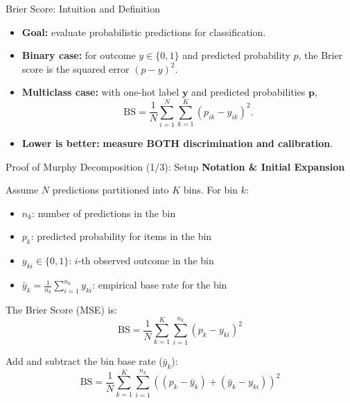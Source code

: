 \documentclass[aspectratio=169]{beamer}
\begin{document}
\begin{frame}{Brier Score: Intuition and Definition}
  \begin{itemize}
    \item \textbf{Goal:} evaluate probabilistic predictions for classification.
    \item \textbf{Binary case:} for outcome $y \in \{0,1\}$ and predicted probability $p$,
          the Brier score is the squared error $(p-y)^2$.
    \item \textbf{Multiclass case:} with one-hot label $\bm{y}$ and predicted
          probabilities $\bm{p}$,
          \[
            \mathrm{BS} = \frac{1}{N} \sum_{i=1}^N \sum_{k=1}^K (p_{ik} - y_{ik})^2.
          \]
    \item \textbf{Lower is better:} \textbf{measure BOTH discrimination and calibration}.
  \end{itemize}
\end{frame}

\begin{frame}{Proof of Murphy Decomposition (1/3): Setup}
  \textbf{Notation \& Initial Expansion}
  
  \vspace{0.2cm}
  Assume $N$ predictions partitioned into $K$ bins. For bin $k$:
  \begin{itemize}
      \item $n_k$: number of predictions in the bin
      \item $p_k$: predicted probability for items in the bin
      \item $y_{ki} \in \{0,1\}$: $i$-th observed outcome in the bin
      \item $\bar{y}_k = \frac{1}{n_k}\sum_{i=1}^{n_k} y_{ki}$: empirical base rate for the bin
  \end{itemize}

  \vspace{0.2cm}
  The Brier Score (MSE) is:
  \[
    \text{BS} = \frac{1}{N} \sum_{k=1}^K \sum_{i=1}^{n_k} (p_k - y_{ki})^2
  \]

  \vspace{0.1cm}
  Add and subtract the bin base rate ($\bar{y}_k$):
  \[
    \text{BS} = \frac{1}{N} \sum_{k=1}^K \sum_{i=1}^{n_k} \left( (p_k - \bar{y}_k) + (\bar{y}_k - y_{ki}) \right)^2
  \]
\end{frame}
\end{document}
